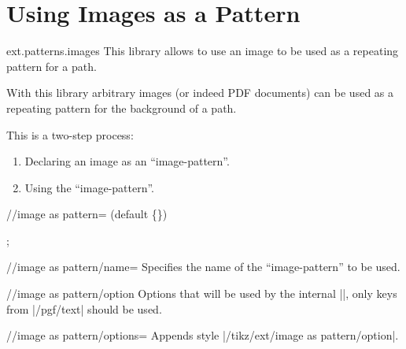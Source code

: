 %
%
%
\clearpage
\section{Using Images as a Pattern}
\label{library:patterns.images}

\begin{tikzlibrary}{ext.patterns.images}
  This library allows to use an image to be used as a repeating pattern for a path.
  
\end{tikzlibrary}

With this library arbitrary images (or indeed PDF documents) can be used as
a repeating pattern for the background of a path.

This is a two-step process:
\begin{enumerate}
\item Declaring an image as an ``image-pattern''.
\item Using the ``image-pattern''.
\end{enumerate}

\begin{command}{\pgfextsetupimageaspattern{}}\cmdcompat{\pgfsetupimageaspattern}
\end{command}

\begin{key}{/\tikzext/image as pattern= (default \{\})}

\begin{codeexample}[preamble=\usetikzlibrary{ext.patterns.images,shapes.geometric}]
\tikz \node[star, minimum size=3cm, draw,
  ext/image as pattern={name=grid, options={left, bottom, y=-.5cm, rotate=45}}] {};
\end{codeexample}
\end{key}

\begin{key}{/\tikzext/image as pattern/name=}
Specifies the name of the ``image-pattern'' to be used.
\end{key}

\begin{stylekey}{/\tikzext/image as pattern/option}
Options that will be used by the internal |\pgftext|,\indexCommandO{\pgftext}
only keys from |/pgf/text| should be used.
\end{stylekey}

\begin{stylekey}{/\tikzext/image as pattern/options=}
Appends style |/tikz/ext/image as pattern/option|.
\end{stylekey}